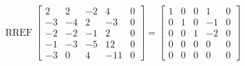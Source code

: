 \begin{exerciseAnswer} 


\[\operatorname{RREF} \left[\begin{array}{cccc|c}
2 & 2 & -2 & 4 & 0 \\
-3 & -4 & 2 & -3 & 0 \\
-2 & -2 & -1 & 2 & 0 \\
-1 & -3 & -5 & 12 & 0 \\
-3 & 0 & 4 & -11 & 0
\end{array}\right] = \left[\begin{array}{cccc|c}
1 & 0 & 0 & 1 & 0 \\
0 & 1 & 0 & -1 & 0 \\
0 & 0 & 1 & -2 & 0 \\
0 & 0 & 0 & 0 & 0 \\
0 & 0 & 0 & 0 & 0
\end{array}\right] \]



\end{exerciseAnswer}

